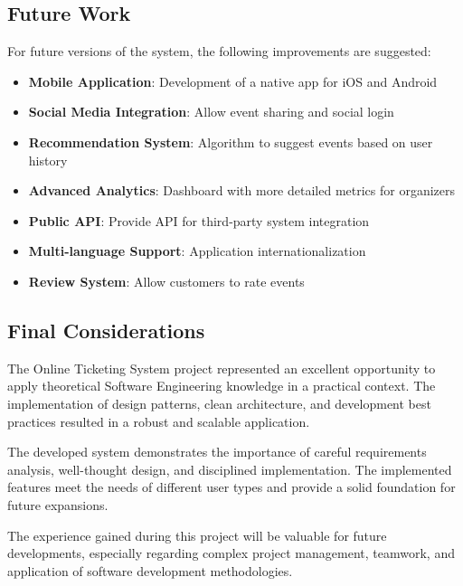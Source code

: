 \documentclass[12pt,a4paper]{article}
\begin{document}
\subsection{Future Work}

For future versions of the system, the following improvements are suggested:

\begin{itemize}
    \item \textbf{Mobile Application}: Development of a native app for iOS and Android
    \item \textbf{Social Media Integration}: Allow event sharing and social login
    \item \textbf{Recommendation System}: Algorithm to suggest events based on user history
    \item \textbf{Advanced Analytics}: Dashboard with more detailed metrics for organizers
    \item \textbf{Public API}: Provide API for third-party system integration
    \item \textbf{Multi-language Support}: Application internationalization
    \item \textbf{Review System}: Allow customers to rate events
\end{itemize}

\subsection{Final Considerations}

The Online Ticketing System project represented an excellent opportunity to apply theoretical Software Engineering knowledge in a practical context. The implementation of design patterns, clean architecture, and development best practices resulted in a robust and scalable application.

The developed system demonstrates the importance of careful requirements analysis, well-thought design, and disciplined implementation. The implemented features meet the needs of different user types and provide a solid foundation for future expansions.

The experience gained during this project will be valuable for future developments, especially regarding complex project management, teamwork, and application of software development methodologies.
\end{document}
